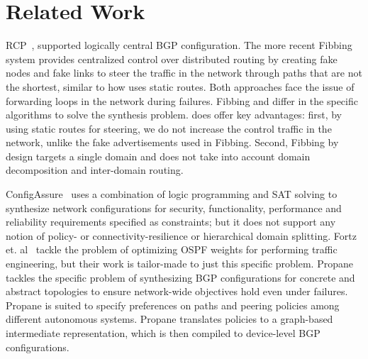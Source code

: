 \section{Related Work}\label{sec:related}
  RCP~\cite{rcp}, supported logically central BGP
configuration. The more recent Fibbing~\cite{fibbing} system provides
centralized control over distributed routing by creating fake nodes
and fake links to steer the traffic in the network through paths that
are not the shortest, similar to how \name uses static routes.  Both
approaches face the issue of forwarding loops in the network during
failures. Fibbing and \name differ in the specific algorithms to solve
the synthesis problem.  \name does offer key advantages: first, by
using static routes for steering, we do not increase the control traffic in
the network, unlike the fake advertisements used in Fibbing. Second,
Fibbing by design targets a single domain and does not take into account
domain decomposition and inter-domain routing. 



ConfigAssure~\cite{configassure}
uses a combination of logic programming and SAT solving to synthesize
network configurations for security, 
functionality, performance and
reliability requirements specified as constraints; 
but it does not
support any notion of policy- or connectivity-resilience 
or hierarchical domain splitting.  Fortz
et. al~\cite{ospf-te} tackle the problem of optimizing OSPF weights
for performing traffic engineering, but their work is tailor-made
to just this specific problem.
Propane~\cite{propane, propaneat} tackles the specific problem of
synthesizing BGP configurations for concrete and abstract topologies
to ensure network-wide objectives hold even under failures. 
Propane is suited to specify preferences on paths and
peering policies among different autonomous systems. Propane
translates policies to a graph-based intermediate representation,
which is then compiled to device-level BGP configurations. 

